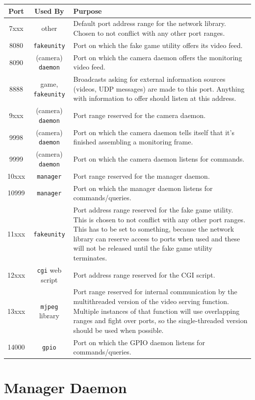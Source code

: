 \begin{tabular}{ccp{}} \hline
Port & Used By & Purpose \\ \hline
%
7xxx & other &
Default port address range for the network library. Chosen to not conflict
with any other port ranges. \\
\hline
8080 & \verb+fakeunity+ &
Port on which the fake game utility offers its video feed. \\
8090 & (camera) \verb+daemon+ &
Port on which the camera daemon offers the monitoring video feed. \\
8888 & game, \verb+fakeunity+ &
Broadcasts asking for external information sources (videos, UDP messages)
are made to this port. Anything with information to offer should listen 
at this address. \\
\hline
9xxx & (camera) \verb+daemon+ &
Port range reserved for the camera daemon. \\
9998 & (camera) \verb+daemon+ &
Port on which the camera daemon tells itself that it's finished assembling 
a monitoring frame. \\
9999 & (camera) \verb+daemon+ &
Port on which the camera daemon listens for commands. \\
\hline
10xxx & \verb+manager+ &
Port range reserved for the manager daemon. \\
10999 & \verb+manager+ &
Port on which the manager daemon listens for commands/queries. \\
\hline
11xxx & \verb+fakeunity+ &
Port address range reserved for the fake game utility. This is chosen to not 
conflict with any other port ranges. This has to be set to something, because 
the network library can reserve access to ports when used and these will not 
be released until the fake game utility terminates. \\
\hline
12xxx & \verb+cgi+ web script &
Port address range reserved for the CGI script. \\
\hline
13xxx & \verb+mjpeg+ library &
Port range reserved for internal communication by the multithreaded version 
of the video serving function. Multiple instances of that function will 
use overlapping ranges and fight over ports, so the single-threaded version 
should be used when possible. \\
\hline
14000 & \verb+gpio+ &
Port on which the GPIO daemon listens for commands/queries. \\
%
\hline
\end{tabular}

\section{Manager Daemon}

